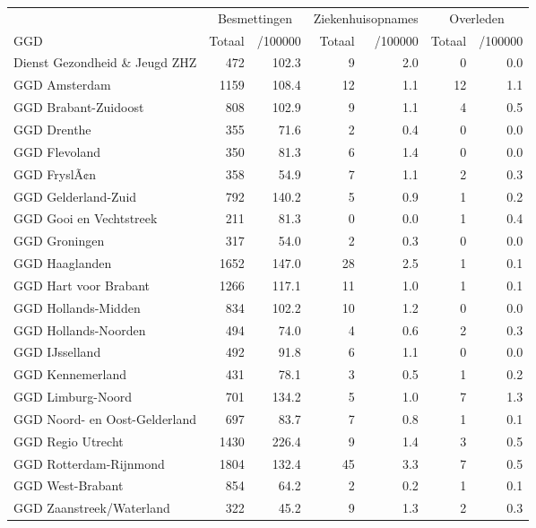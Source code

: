 \documentclass[
  english,
  man,floatsintext]{apa6}
\begin{document}
\begin{table}
\centering\begingroup\fontsize{10}{12}\selectfont

\begin{threeparttable}
\begin{tabular}{lrrrrrr}
\toprule
\multicolumn{1}{c}{ } & \multicolumn{2}{c}{Besmettingen} & \multicolumn{2}{c}{Ziekenhuisopnames} & \multicolumn{2}{c}{Overleden} \\
\cmidrule(l{3pt}r{3pt}){2-3} \cmidrule(l{3pt}r{3pt}){4-5} \cmidrule(l{3pt}r{3pt}){6-7}
GGD & Totaal & /100000 & Totaal & /100000 & Totaal & /100000\\
\midrule
Dienst Gezondheid \& Jeugd ZHZ & 472 & 102.3 & 9 & 2.0 & 0 & 0.0\\
GGD Amsterdam & 1159 & 108.4 & 12 & 1.1 & 12 & 1.1\\
GGD Brabant-Zuidoost & 808 & 102.9 & 9 & 1.1 & 4 & 0.5\\
GGD Drenthe & 355 & 71.6 & 2 & 0.4 & 0 & 0.0\\
GGD Flevoland & 350 & 81.3 & 6 & 1.4 & 0 & 0.0\\
GGD FryslÃ¢n & 358 & 54.9 & 7 & 1.1 & 2 & 0.3\\
GGD Gelderland-Zuid & 792 & 140.2 & 5 & 0.9 & 1 & 0.2\\
GGD Gooi en Vechtstreek & 211 & 81.3 & 0 & 0.0 & 1 & 0.4\\
GGD Groningen & 317 & 54.0 & 2 & 0.3 & 0 & 0.0\\
GGD Haaglanden & 1652 & 147.0 & 28 & 2.5 & 1 & 0.1\\
GGD Hart voor Brabant & 1266 & 117.1 & 11 & 1.0 & 1 & 0.1\\
GGD Hollands-Midden & 834 & 102.2 & 10 & 1.2 & 0 & 0.0\\
GGD Hollands-Noorden & 494 & 74.0 & 4 & 0.6 & 2 & 0.3\\
GGD IJsselland & 492 & 91.8 & 6 & 1.1 & 0 & 0.0\\
GGD Kennemerland & 431 & 78.1 & 3 & 0.5 & 1 & 0.2\\
GGD Limburg-Noord & 701 & 134.2 & 5 & 1.0 & 7 & 1.3\\
GGD Noord- en Oost-Gelderland & 697 & 83.7 & 7 & 0.8 & 1 & 0.1\\
GGD Regio Utrecht & 1430 & 226.4 & 9 & 1.4 & 3 & 0.5\\
GGD Rotterdam-Rijnmond & 1804 & 132.4 & 45 & 3.3 & 7 & 0.5\\
GGD West-Brabant & 854 & 64.2 & 2 & 0.2 & 1 & 0.1\\
GGD Zaanstreek/Waterland & 322 & 45.2 & 9 & 1.3 & 2 & 0.3\\

\end{tabular}
\end{threeparttable}
\end{table}
\end{document}
